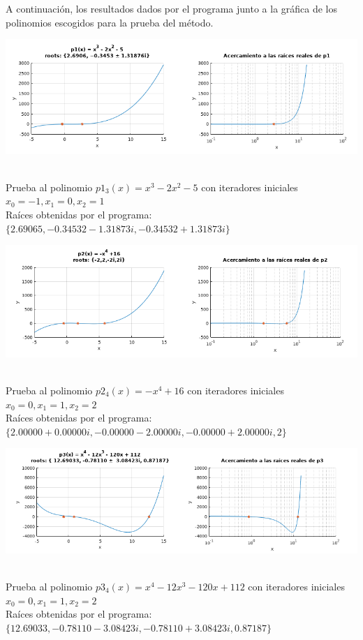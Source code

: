 \documentclass[11pt]{article}
\begin{document}
A continuación, los resultados dados por el programa junto a la gráfica de los polinomios escogidos para la prueba del método.
\begin{center}
    \includegraphics[keepaspectratio, width=14cm]{P1.png}
    \caption \tiny{\\Prueba al polinomio $p1_3(x) = x^3 - 2x^2 - 5$ con iteradores iniciales $x_0 = -1, x_1 = 0, x_2 = 1$
    \\Raíces obtenidas por el programa: $\{2.69065, -0.34532 - 1.31873i, -0.34532 + 1.31873i\}$
    }
    \vspace{0.5cm}
    
    \includegraphics[keepaspectratio, width=14cm]{P2.png}
     \caption \tiny{\\Prueba al polinomio $p2_4(x) = -x^4 +16$ con iteradores iniciales $x_0 = 0, x_1 = 1, x_2 = 2$
     \\Raíces obtenidas por el programa: $\{2.00000 + 0.00000i,  -0.00000 - 2.00000i,  -0.00000 + 2.00000i,   2\}$}
     \vspace{0.5cm}
     
    \includegraphics[keepaspectratio, width=14cm]{P3.png}
     \caption \tiny{\\Prueba al polinomio $p3_4(x) = x^4 - 12x^3 - 120x + 112$ con iteradores iniciales $x_0 = 0, x_1 = 1, x_2 = 2$
     \\Raíces obtenidas por el programa: $\{12.69033,  -0.78110 -  3.08423i,   -0.78110 +  3.08423i,    0.87187\}$}
\end{center} 
\end{document}
